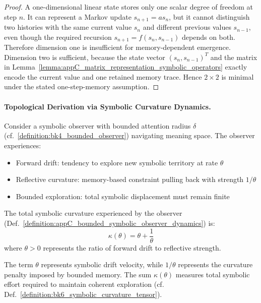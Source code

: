 \begin{proof}
\label{proof:appC_conditional_minimality_2x2}
A one-dimensional linear state stores only one scalar degree of freedom at step
$n$. It can represent a Markov update $s_{n+1}=a s_n$, but it cannot distinguish
two histories with the same current value $s_n$ and different previous values
$s_{n-1}$, even though the required recursion
$s_{n+1}=f(s_n,s_{n-1})$ depends on both. Therefore dimension one is insufficient
for memory-dependent emergence. Dimension two is sufficient, because the state
vector $(s_n,s_{n-1})^T$ and the matrix in
Lemma~\ref{lemma:appC_matrix_representation_symbolic_operators} exactly encode the
current value and one retained memory trace. Hence $2\times2$ is minimal under the
stated one-step-memory assumption.
\end{proof}

\paragraph{Topological Derivation via Symbolic Curvature Dynamics.}
\label{subsec:appC_topological_derivation_symbolic_curvature}

\begin{definition}
\label{definition:appC_bounded_symbolic_observer_dynamics}
Consider a symbolic observer with bounded attention radius $\delta$ (cf.~\ref{definition:bk4_bounded_observer}) navigating meaning space. The observer experiences:
\begin{itemize}
\item Forward drift: tendency to explore new symbolic territory at rate $\theta$
\item Reflective curvature: memory-based constraint pulling back with strength $1/\theta$
\item Bounded exploration: total symbolic displacement must remain finite
\end{itemize}
\end{definition}

\begin{definition}
\label{definition:appC_symbolic_curvature_function}
The total symbolic curvature experienced by the observer (Def.~\ref{definition:appC_bounded_symbolic_observer_dynamics}) is:
\[
\kappa(\theta) = \theta + \frac{1}{\theta}
\]
where $\theta > 0$ represents the ratio of forward drift to reflective strength.
\end{definition}

\begin{lemma}
\label{lemma:appC_geometric_interpretation_curvature}
The term $\theta$ represents symbolic drift velocity, while $1/\theta$ represents
the curvature penalty imposed by bounded memory. The sum $\kappa(\theta)$ measures
total symbolic effort required to maintain coherent exploration (cf.
Def.~\ref{definition:bk6_symbolic_curvature_tensor}).
\end{lemma}

